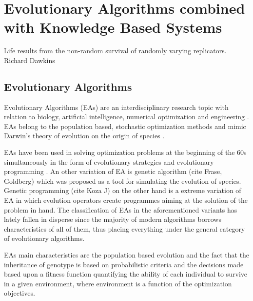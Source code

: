 \chapter{Evolutionary Algorithms combined with Knowledge Based Systems} %

\ifpdf
    \graphicspath{{2/figures/PNG/}{2/figures/PDF/}{2/figures/}}
\else
    \graphicspath{{2/figures/EPS/}{2/figures/}}
\fi


\begin{flushright}
Life results from the non-random survival 
\linebreak
of randomly varying replicators.
\linebreak
Richard Dawkins 
\end{flushright}
\section{Evolutionary Algorithms}
Evolutionary Algorithms (EAs) are an interdisciplinary research topic with relation to biology, artificial intelligence, numerical optimization and engineering \cite{Back1996}. EAs belong to the population based, stochastic optimization methods and mimic Darwin's theory of evolution on the origin of species \cite{Darwin}. 

EAs have been  used in solving optimization problems at the beginning of the 60s simultaneously in the form of evolutionary strategies \cite{Rechenberg} and evolutionary programming \cite{Fogel}. An other variation of EA is genetic algorithm (cite Frase, Goldberg) which was proposed as a tool for simulating the evolution of species. Genetic programming (cite Koza J) on the other hand is a extreme variation of EA in which evolution operators create programmes aiming at the solution of the problem in hand. The classification of EAs in the aforementioned variants has lately fallen in disperse since the majority of modern algorithms borrows characteristics of all of them, thus placing everything under the general category of evolutionary algorithms.     

EAs main characteristics are the population based evolution and the fact that the inheritance of genotype is based on probabilistic criteria and the decisions made based upon a fitness function quantifying the ability of each individual to survive in a given environment, where environment is a function of the optimization objectives. 

